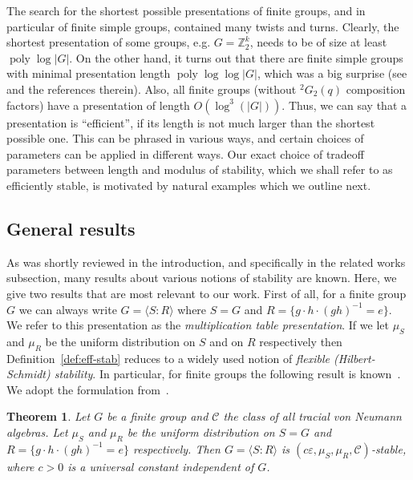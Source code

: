 \documentclass[11pt]{article}
\newtheorem{theorem}{Theorem}[section]
\theoremstyle{definition}
\newcommand{\Z}{\ensuremath{\mathbb{Z}}}
\newcommand{\mC}{\ensuremath{\mathcal{C}}}
\DeclareMathOperator{\poly}{poly}
\newcommand{\eps}{\varepsilon}
\begin{document}
The search for the shortest possible presentations of finite groups, and in particular of finite simple groups, contained many twists and turns. Clearly, the shortest presentation of some groups, e.g. $G=\Z_2^k$, needs to be of size at least $\poly\log|G|$. On the other hand, it turns out that there are finite simple groups with minimal presentation length $\poly\log\log|G|$, which was a big surprise (see \cite{guralnick2008presentations} and the references therein). Also, all finite groups (without ${}^2G_2(q)$ composition factors) have a presentation of length $O(\log^3(|G|))$. Thus, we can say that a presentation is ``efficient'', if its length is not much larger than the shortest possible one. This can be phrased in various ways, and certain choices of parameters can be applied in different ways. Our exact choice of tradeoff parameters between length and modulus of stability, which we shall refer to as efficiently stable,  is motivated by natural examples which we outline next.



\subsection{General results}

As was shortly reviewed in the introduction, and specifically in the related works subsection, many results about various notions of stability are known.  Here, we give two results that are most relevant to our work. First of all, 
for a finite group $G$ we can always write $G=\langle S:R\rangle$ where $S = G$ and $R=\{ g\cdot h \cdot (gh)^{-1} =e \}$. We refer to this presentation as the \emph{multiplication table presentation}. If we let $\mu_S$ and $\mu_R$ be the uniform distribution on $S$ and on $R$ respectively then Definition~\ref{def:eff-stab} reduces to a widely used notion of \emph{flexible (Hilbert-Schmidt) stability}. In particular, for finite groups the following result is known~\cite{gowers2017inverse,de2019operator}. We adopt the formulation from~\cite[Theorem 1.4]{de2022spectral}.

\begin{theorem}\label{thm:gh}
Let $G$ be a finite group and $\mC$ the class of all tracial von Neumann algebras. Let $\mu_S$ and $\mu_R$ be the uniform distribution on $S=G$ and $R=\{ g\cdot h \cdot (gh)^{-1}=e \}$ respectively. Then $G=\langle S:R\rangle$ is $(c\eps,\mu_S,\mu_R,\mC)$-stable, where $c>0$ is a universal constant independent of $G$.
\end{theorem}
\end{document}
